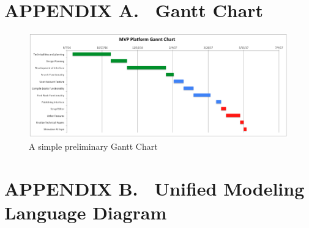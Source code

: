 \documentclass[letterpaper, 10pt, draftclsnofoot, onecolumn]{IEEEtran}
\begin{document}
{{{\section[APPENDIX A. \ Gantt Chart]{\rmfamily\bfseries\color{black}
APPENDIX A. \ Gantt Chart}

\bigskip



\begin{figure}[ht!]
\centering
\includegraphics[width=160mm]{gantt_chart.png}
\caption{A simple preliminary Gantt Chart}
\end{figure}

\clearpage\setcounter{page}{1}\pagestyle{Convertviii}
\section[APPENDIX B. \ UML Diagram]{\rmfamily\bfseries\color{black}
APPENDIX B. \ Unified Modeling Language Diagram}

\bigskip


}}}
\end{document}
